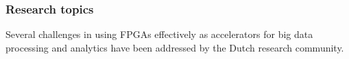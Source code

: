 \subsubsection*{\bf{Research topics}}
Several challenges in using FPGAs effectively as accelerators for big data processing and analytics have been addressed by the Dutch research community.
    
    
